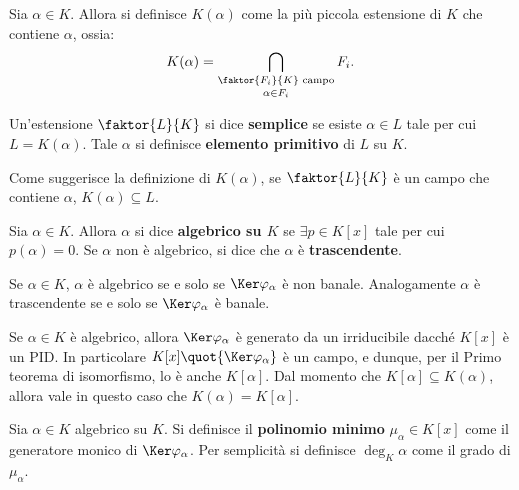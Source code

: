 \documentclass[12pt]{scrartcl}
\begin{document}
	\begin{definition}
		Sia $\alpha \in K$. Allora si definisce $K(\alpha)$
		come la più piccola estensione di $K$ che contiene
		$\alpha$, ossia:
		\[ K(\alpha) = \bigcap_{\substack{\faktor{F_i}{K} \text{ campo}	\\[0.02in] \alpha \in F_i}} F_i. \]
	\end{definition}

	\begin{definition}
		Un'estensione $\faktor{L}{K}$ si dice \textbf{semplice}
		se esiste $\alpha \in L$ tale per cui $L = K(\alpha)$.
		Tale $\alpha$ si definisce \textbf{elemento primitivo}
		di $L$ su $K$.
	\end{definition}

	\begin{remark}
		Come suggerisce la definizione di $K(\alpha)$, se
		$\faktor{L}{K}$ è un campo che contiene $\alpha$,
		$K(\alpha) \subseteq L$.
	\end{remark}

	\begin{definition}
		Sia $\alpha \in K$. Allora $\alpha$ si dice \textbf{algebrico su $K$} se $\exists p \in K[x]$
		tale per cui $p(\alpha) = 0$. Se $\alpha$ non è
		algebrico, si dice che $\alpha$ è \textbf{trascendente}.
	\end{definition}

	\begin{remark}
		Se $\alpha \in K$, $\alpha$ è algebrico se e solo
		se $\Ker \varphi_\alpha$ è non banale. Analogamente
		$\alpha$ è trascendente se e solo se $\Ker \varphi_\alpha$ è banale.
	\end{remark}

	\begin{remark}
		Se $\alpha \in K$ è algebrico, allora $\Ker \varphi_\alpha$ è generato da un irriducibile dacché
		$K[x]$ è un PID. In particolare $K[x] \quot {\Ker \varphi_\alpha}$ è un campo, e dunque, per il Primo
		teorema di isomorfismo, lo è anche $K[\alpha]$.
		Dal momento che $K[\alpha] \subseteq K(\alpha)$,
		allora vale in questo caso che $K(\alpha) = K[\alpha]$.
	\end{remark}

	\begin{definition}
		Sia $\alpha \in K$ algebrico su $K$. Si definisce il \textbf{polinomio minimo}
		$\mu_\alpha \in K[x]$ come il generatore monico di
		$\Ker \varphi_\alpha$. Per semplicità si definisce
		$\deg_K \alpha$ come il grado di $\mu_\alpha$. 
	\end{definition}
\end{document}
